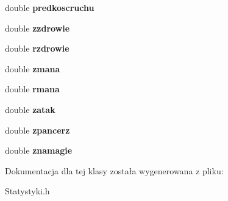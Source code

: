 \begin{DoxyCompactItemize}
\item 
double {\bfseries predkoscruchu}\hypertarget{class_statystyki_a93d335a339f20b3cabfd082aa09e38da}{}\label{class_statystyki_a93d335a339f20b3cabfd082aa09e38da}

\item 
double {\bfseries zzdrowie}\hypertarget{class_statystyki_a98bb51470e07606886a89f2289dfd115}{}\label{class_statystyki_a98bb51470e07606886a89f2289dfd115}

\item 
double {\bfseries rzdrowie}\hypertarget{class_statystyki_a6e1e421fe7d64305b193d64a4df8dc10}{}\label{class_statystyki_a6e1e421fe7d64305b193d64a4df8dc10}

\item 
double {\bfseries zmana}\hypertarget{class_statystyki_a072c834ff178954087efad2a9fc1e515}{}\label{class_statystyki_a072c834ff178954087efad2a9fc1e515}

\item 
double {\bfseries rmana}\hypertarget{class_statystyki_a6dcc8fefe27b66fdb9a4ec9ce0e9ec75}{}\label{class_statystyki_a6dcc8fefe27b66fdb9a4ec9ce0e9ec75}

\item 
double {\bfseries zatak}\hypertarget{class_statystyki_addde4e69058010e41430c6e64adbf492}{}\label{class_statystyki_addde4e69058010e41430c6e64adbf492}

\item 
double {\bfseries zpancerz}\hypertarget{class_statystyki_ad394e2cf0f6e62741c6a3801a6f790be}{}\label{class_statystyki_ad394e2cf0f6e62741c6a3801a6f790be}

\item 
double {\bfseries znamagie}\hypertarget{class_statystyki_abb2d2fc24214ec2f45dcd6cc5552bfbb}{}\label{class_statystyki_abb2d2fc24214ec2f45dcd6cc5552bfbb}

\end{DoxyCompactItemize}


Dokumentacja dla tej klasy została wygenerowana z pliku\+:\begin{DoxyCompactItemize}
\item 
Statystyki.\+h\end{DoxyCompactItemize}
